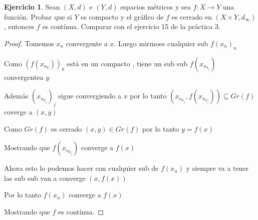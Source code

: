 \documentclass[11pt]{report}
\newcommand{\ra}{\rightarrow}
\theoremstyle{definition}
\newtheorem{ej}{Ejercicio}
\begin{document}
	\begin{ej}
		Sean $(X,d)$ e $(Y,d)$ espacios métricos y sea $f : X \ra Y$ una función. Probar que si $Y$ es compacto y el gráfico de $f$ es cerrado en $(X\times Y, d_{\infty})$, entonces $f$ es contínua. Comparar con el ejercicio 15 de la práctica 3.
		\begin{proof}
			Tomemos $x_n$ convergente a $x$.  Luego mirmoes cualquier sub $f(x_n)_n$

			Como $(f(x_{n_k}))_k$ está en un compacto , tiene un sub sub $f(x_{n_{k_j}})$ convergentea $y$

			Además $(x_{n_{k_j}})_j$ sigue convergiendo a $x$ por lo tanto $(x_{n_{k_j}},f(x_{n_{k_j}})) \subseteq Gr(f)$ coverge a $(x,y)$

			Como $Gr(f)$ es cerrado $(x,y) \in Gr(f)$ por lo tanto $y = f(x)$

			Mostrando que $f(x_{n_{k_j}})$ converge a $f(x)$

			Ahora esto lo podemos hacer con cualquier sub de $f(x_n)$ y siempre va a tener las sub sub van a converge $(x,f(x))$

			Por lo tanto $f(x_n)$ converge a $f(x)$

			Mostrando que $f$ es contínua.

		\end{proof}
	\end{ej}
	
\end{document}
